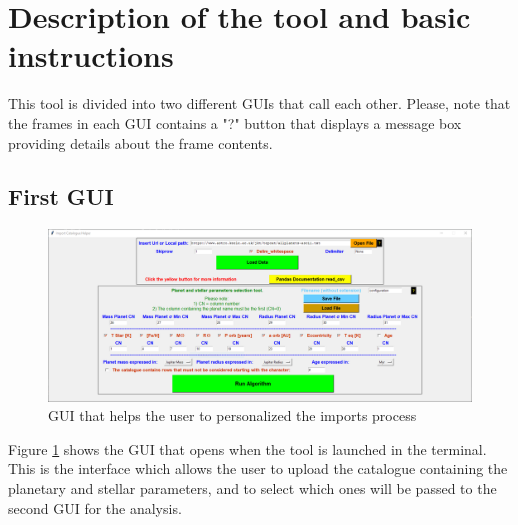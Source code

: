 \documentclass[fleqn,10pt]{SelfArx} %
\begin{document}
	\section{Description of the tool and basic instructions}
	This tool is divided into two different GUIs that call each other.
    Please, note that the frames in each GUI contains a "?" button that displays a message box providing details about the frame contents.

        \subsection{First GUI}

            \begin{figure}[ht]\centering %
            	\includegraphics[width=\linewidth]{pictures/Import_Catalogue_Helper.PNG}
            	\caption{GUI that helps the user to personalized the imports process}
            	\label{fig:GUI1}
            \end{figure}

        	Figure \ref{fig:GUI1} shows the GUI that opens when the tool is launched in the terminal.
            This is the interface which allows the user to upload the catalogue containing the planetary and stellar parameters, and to select which ones will be passed to the second GUI for the analysis.
\end{document}
